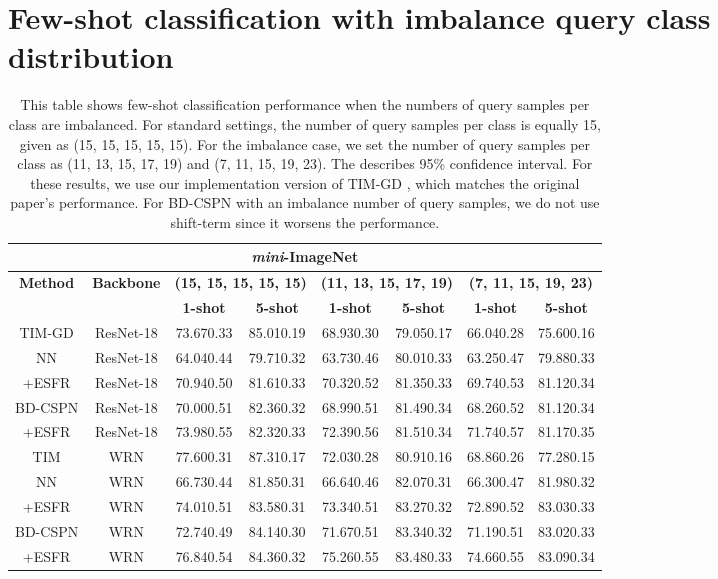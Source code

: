 \documentclass{article}
\begin{document}
\section{Few-shot classification with imbalance query class distribution}
\label{section:imbalance}
\begin{table}[t]
	\begin{small}
		\caption{
			This table shows few-shot classification performance when the numbers of query samples per class are imbalanced.
			For standard settings, the number of query samples per class is equally 15, given as (15, 15, 15, 15, 15).
			For the imbalance case, we set the number of query samples per class as (11, 13, 15, 17, 19) and (7, 11, 15, 19, 23).
			The  describes 95\% confidence interval.
			For these results, we use our implementation version of TIM-GD \cite{TIM}, which matches the original paper's performance.
			For BD-CSPN \cite{BDCSPN} with an imbalance number of query samples, we do not use shift-term since it worsens the performance.}
		\label{table:imbalance}
		\begin{center}
			\begin{tabular}{cccccccc}
				\hline
				\multicolumn{8}{c}{\textbf{\textit{mini}-ImageNet}} \\ \hline
				\multirow{2}{*}{\textbf{Method}} & \multirow{2}{*}{\textbf{Backbone}} & \multicolumn{2}{c}{\textbf{(15, 15, 15, 15, 15)}} & \multicolumn{2}{c}{\textbf{(11, 13, 15, 17, 19)}} & \multicolumn{2}{c}{\textbf{(7, 11, 15, 19, 23)}} \\
				&  & \textbf{1-shot} & \textbf{5-shot} & \textbf{1-shot} & \textbf{5-shot} & \textbf{1-shot} & \textbf{5-shot} \\ \hline
				TIM-GD & ResNet-18 & 73.670.33 & 85.010.19 & 68.930.30 & 79.050.17 & 66.040.28 & 75.600.16 \\ \hline
				NN & ResNet-18 & 64.040.44 & 79.710.32 & 63.730.46 & 80.010.33 & 63.250.47 & 79.880.33 \\
				\rowcolor[HTML]{EFEFEF}+ESFR & ResNet-18 & 70.940.50 & 81.610.33 & 70.320.52 & 81.350.33 & 69.740.53 & 81.120.34 \\ \hline
				BD-CSPN & ResNet-18 & 70.000.51 & 82.360.32 & 68.990.51 & 81.490.34 & 68.260.52 & 81.120.34 \\
				\rowcolor[HTML]{EFEFEF}+ESFR & ResNet-18 & 73.980.55 & 82.320.33 & 72.390.56 & 81.510.34 & 71.740.57 & 81.170.35 \\ \hline
				TIM & WRN & 77.600.31 & 87.310.17 & 72.030.28 & 80.910.16 & 68.860.26 & 77.280.15 \\ \hline
				NN & WRN & 66.730.44 & 81.850.31 & 66.640.46 & 82.070.31 & 66.300.47 & 81.980.32 \\
				\rowcolor[HTML]{EFEFEF}+ESFR & WRN & 74.010.51 & 83.580.31 & 73.340.51 & 83.270.32 & 72.890.52 & 83.030.33 \\ \hline
				BD-CSPN & WRN & 72.740.49 & 84.140.30 & 71.670.51 & 83.340.32 & 71.190.51 & 83.020.33 \\
				\rowcolor[HTML]{EFEFEF}+ESFR & WRN & 76.840.54 & 84.360.32 & 75.260.55 & 83.480.33 & 74.660.55 & 83.090.34 \\ \hline
				

\end{tabular}
\end{center}
\end{small}
\end{table}
\end{document}
